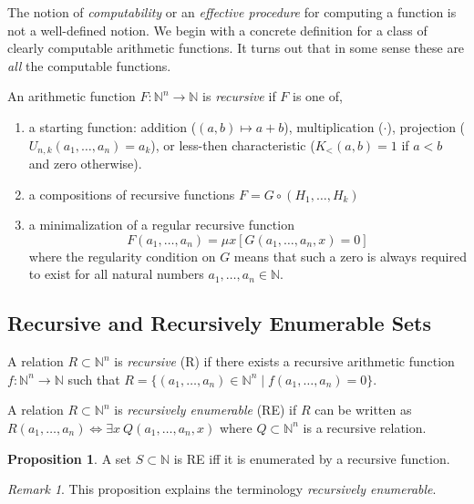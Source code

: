 \documentclass[12pt, leqno]{article}
\newcommand{\N}{\mathbb{N}}
\newcommand{\eq}[1]{\exists{#1} \:}
\newenvironment{definition}[1][Definition:]{\begin{trivlist}
\item[\hskip \labelsep {\bfseries #1}]}{\end{trivlist}}
\theoremstyle{theorem}
\theoremstyle{definition}
\theoremstyle{definition}
\newtheorem*{proposition}{Proposition}
\theoremstyle{remark}
\theoremstyle{definition}
\theoremstyle{remark}
\newtheorem{remark}{Remark}[subsection]
\begin{document}
The notion of \textit{computability} or an \textit{effective procedure} for computing a function is not a well-defined notion. 
We begin with a concrete definition for a class of clearly computable arithmetic functions. It turns out that in some sense these are \textit{all} the computable functions. 

\begin{definition}
An arithmetic function $F : \N^n \to \N$ is \textit{recursive} if $F$ is one of,
\begin{enumerate}
\item a starting function: addition ($(a,b) \mapsto a+b$), multiplication ($\cdot$), projection ($U_{n,k}(a_1, \dots, a_n) = a_k$), or less-then characteristic ($K_{<}(a,b) = 1$ if $a < b$ and zero otherwise).
\item a compositions of recursive functions $F = G \circ (H_1, \dots, H_k)$
\item a minimalization of a regular recursive function \[ F(a_1, \dots, a_n) = \mu x [G(a_1, \dots, a_n, x) = 0] \] where the regularity condition on $G$ means that such a zero is always required to exist for all natural numbers $a_1, \dots, a_n \in \N$. 
\end{enumerate}
\end{definition}


\subsection{Recursive and Recursively Enumerable Sets}

\begin{definition}
A relation $R \subset \N^n$ is \textit{recursive} (R) if there exists a recursive arithmetic function $f : \N^n \to \N$ such that $R = \{ (a_1, \dots, a_n) \in \N^n \mid f(a_1, \dots, a_n) = 0\}$.
\end{definition}

\begin{definition}
A relation $R \subset \N^n$ is \textit{recursively enumerable} (RE) if $R$ can be written as $R(a_1, \dots, a_n) \iff \eq{x} Q(a_1, \dots, a_n, x)$ where $Q \subset \N^n$ is a recursive relation.
\end{definition}

\begin{proposition}
A set $S \subset \N$ is RE iff it is enumerated by a recursive function.
\end{proposition}

\begin{remark}
This proposition explains the terminology \textit{recursively enumerable}.
\end{remark}
\end{document}
